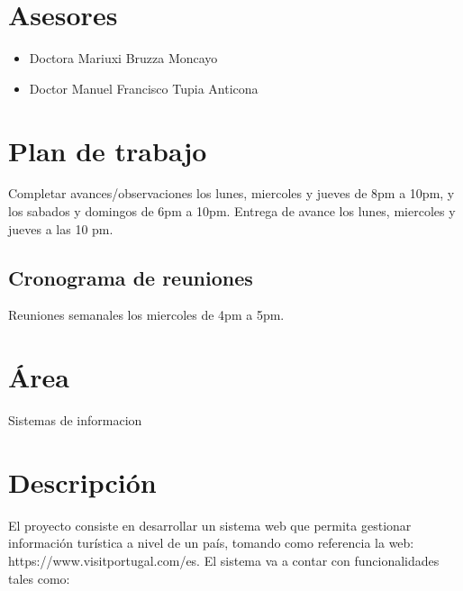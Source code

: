 \documentclass{article}
\begin{document}


\section{Asesores}
\begin{itemize}
    \item{Doctora Mariuxi Bruzza Moncayo}
    \item{Doctor Manuel Francisco Tupia Anticona}
\end{itemize}

\section{Plan de trabajo}

Completar avances/observaciones los lunes, miercoles y jueves de 8pm a 10pm, y
los sabados y domingos de 6pm a 10pm. Entrega de avance los lunes,
miercoles y jueves a las 10 pm.

\subsection{Cronograma de reuniones}

Reuniones semanales los miercoles de 4pm a 5pm.

\section{Área}

Sistemas de informacion

\section{Descripción}

El proyecto consiste en desarrollar un sistema web que permita gestionar
información turística a nivel de un país, tomando como referencia la web:
https://www.visitportugal.com/es.
El sistema va a contar con funcionalidades tales como:
\end{document}

